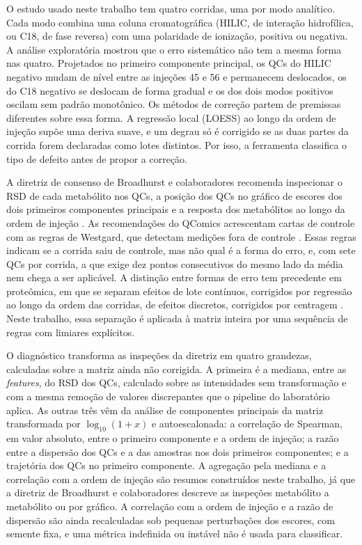 O estudo usado neste trabalho tem quatro corridas, uma por modo analítico. Cada modo combina uma coluna cromatográfica (HILIC, de interação hidrofílica, ou C18, de fase reversa) com uma polaridade de ionização, positiva ou negativa. A análise exploratória mostrou que o erro sistemático não tem a mesma forma nas quatro. Projetados no primeiro componente principal, os QCs do HILIC negativo mudam de nível entre as injeções 45 e 56 e permanecem deslocados, os do C18 negativo se deslocam de forma gradual e os dos dois modos positivos oscilam sem padrão monotônico. Os métodos de correção partem de premissas diferentes sobre essa forma. A regressão local (LOESS) ao longo da ordem de injeção supõe uma deriva suave, e um degrau só é corrigido se as duas partes da corrida forem declaradas como lotes distintos. Por isso, a ferramenta classifica o tipo de defeito antes de propor a correção.

A diretriz de consenso de Broadhurst e colaboradores recomenda inspecionar o RSD de cada metabólito nos QCs, a posição dos QCs no gráfico de escores dos dois primeiros componentes principais e a resposta dos metabólitos ao longo da ordem de injeção \cite{broadhurst2018guidelines}. As recomendações do QComics acrescentam cartas de controle com as regras de Westgard, que detectam medições fora de controle \cite{doi:10.1021/acs.analchem.3c03660}. Essas regras indicam se a corrida saiu de controle, mas não qual é a forma do erro, e, com sete QCs por corrida, a que exige dez pontos consecutivos do mesmo lado da média nem chega a ser aplicável. A distinção entre formas de erro tem precedente em proteômica, em que se separam efeitos de lote contínuos, corrigidos por regressão ao longo da ordem das corridas, de efeitos discretos, corrigidos por centragem \cite{cuklina2021diagnostics}. Neste trabalho, essa separação é aplicada à matriz inteira por uma sequência de regras com limiares explícitos.

O diagnóstico transforma as inspeções da diretriz em quatro grandezas, calculadas sobre a matriz ainda não corrigida. A primeira é a mediana, entre as \emph{features}, do RSD dos QCs, calculado sobre as intensidades sem transformação e com a mesma remoção de valores discrepantes que o pipeline do laboratório aplica. As outras três vêm da análise de componentes principais da matriz transformada por \(\log_{10}(1 + x)\) e autoescalonada: a correlação de Spearman, em valor absoluto, entre o primeiro componente e a ordem de injeção; a razão entre a dispersão dos QCs e a das amostras nos dois primeiros componentes; e a trajetória dos QCs no primeiro componente. A agregação pela mediana e a correlação com a ordem de injeção são resumos construídos neste trabalho, já que a diretriz de Broadhurst e colaboradores descreve as inspeções metabólito a metabólito ou por gráfico. A correlação com a ordem de injeção e a razão de dispersão são ainda recalculadas sob pequenas perturbações dos escores, com semente fixa, e uma métrica indefinida ou instável não é usada para classificar.


